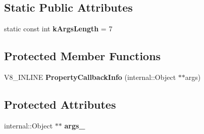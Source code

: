 \subsection*{Static Public Attributes}
\begin{DoxyCompactItemize}
\item 
static const int {\bfseries k\+Args\+Length} = 7\hypertarget{classv8_1_1PropertyCallbackInfo_a9fc9663a2e23f9324fe61f92d1e7e5b5}{}\label{classv8_1_1PropertyCallbackInfo_a9fc9663a2e23f9324fe61f92d1e7e5b5}

\end{DoxyCompactItemize}
\subsection*{Protected Member Functions}
\begin{DoxyCompactItemize}
\item 
V8\+\_\+\+I\+N\+L\+I\+NE {\bfseries Property\+Callback\+Info} (internal\+::\+Object $\ast$$\ast$args)\hypertarget{classv8_1_1PropertyCallbackInfo_aa666043c86d4db9a57a3ac866c78ee0e}{}\label{classv8_1_1PropertyCallbackInfo_aa666043c86d4db9a57a3ac866c78ee0e}

\end{DoxyCompactItemize}
\subsection*{Protected Attributes}
\begin{DoxyCompactItemize}
\item 
internal\+::\+Object $\ast$$\ast$ {\bfseries args\+\_\+}\hypertarget{classv8_1_1PropertyCallbackInfo_a57b2243627071c62ed3900a741a41a0b}{}\label{classv8_1_1PropertyCallbackInfo_a57b2243627071c62ed3900a741a41a0b}

\end{DoxyCompactItemize}
